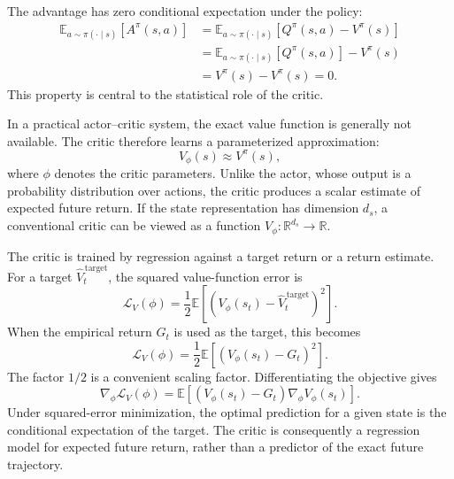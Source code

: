 The advantage has zero conditional expectation under the policy:
\begin{align}
    \mathbb{E}_{a\sim\pi(\cdot\mid s)}
    [A^\pi(s,a)]
    &=
    \mathbb{E}_{a\sim\pi(\cdot\mid s)}
    [Q^\pi(s,a)-V^\pi(s)]
    \nonumber\\
    &=
    \mathbb{E}_{a\sim\pi(\cdot\mid s)}[Q^\pi(s,a)]
    -V^\pi(s)
    \nonumber\\
    &=
    V^\pi(s)-V^\pi(s)
    =
    0.
    \label{eq:ac-zero-mean-advantage}
\end{align}
This property is central to the statistical role of the critic.

In a practical actor--critic system, the exact value function is generally
not available. The critic therefore learns a parameterized approximation:
\begin{equation}
    V_\phi(s)\approx V^\pi(s),
    \label{eq:ac-critic-approximation}
\end{equation}
where \(\phi\) denotes the critic parameters. Unlike the actor, whose output
is a probability distribution over actions, the critic produces a scalar
estimate of expected future return. If the state representation has
dimension \(d_s\), a conventional critic can be viewed as a function
\(V_\phi:\mathbb{R}^{d_s}\rightarrow\mathbb{R}\).

The critic is trained by regression against a target return or a return
estimate. For a target \(\widehat{V}^{\,\mathrm{target}}_t\), the squared
value-function error is
\begin{equation}
    \mathcal{L}_{V}(\phi)
    =
    \frac{1}{2}
    \mathbb{E}
    \left[
        \left(
            V_\phi(s_t)-\widehat{V}^{\,\mathrm{target}}_t
        \right)^2
    \right].
    \label{eq:ac-value-loss}
\end{equation}
When the empirical return \(G_t\) is used as the target, this becomes
\begin{equation}
    \mathcal{L}_{V}(\phi)
    =
    \frac{1}{2}
    \mathbb{E}
    \left[
        \left(V_\phi(s_t)-G_t\right)^2
    \right].
    \label{eq:ac-monte-carlo-value-loss}
\end{equation}
The factor \(1/2\) is a convenient scaling factor. Differentiating the
objective gives
\begin{equation}
    \nabla_\phi\mathcal{L}_{V}(\phi)
    =
    \mathbb{E}
    \left[
        \left(V_\phi(s_t)-G_t\right)
        \nabla_\phi V_\phi(s_t)
    \right].
    \label{eq:ac-value-gradient}
\end{equation}
Under squared-error minimization, the optimal prediction for a given state
is the conditional expectation of the target. The critic is consequently
a regression model for expected future return, rather than a predictor of
the exact future trajectory.

